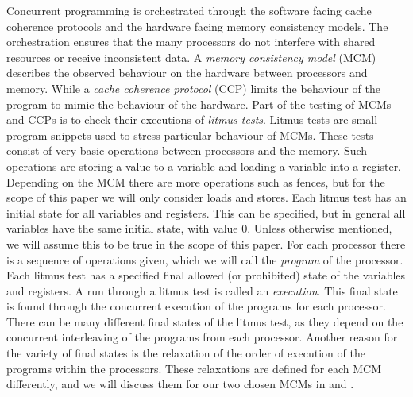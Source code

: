 \documentclass[runningheads]{llncs}
\begin{document}
Concurrent programming is orchestrated through the software facing cache coherence protocols and the hardware facing memory consistency models.
The orchestration ensures that the many processors do not interfere with shared resources or receive inconsistent data.
A \emph{memory consistency model} (MCM) describes the observed behaviour on the hardware between  processors and memory.
While a \emph{cache coherence protocol} (CCP) limits the behaviour of the program to mimic the behaviour of the hardware.
Part of the testing of MCMs and CCPs is to check their executions of \emph{litmus tests}.
Litmus tests are small program snippets used to stress particular behaviour of MCMs.
These tests consist of very basic operations between processors and the memory.
Such operations are storing a value to a variable and loading a variable into a register.
Depending on the MCM there are more operations such as fences, but for the scope of this paper we will only consider loads and stores.
Each litmus test has an initial state for all variables and registers.
This can be specified, but in general all variables have the same initial state, with value 0.
Unless otherwise mentioned, we will assume this to be true in the scope of this paper.
For each processor there is a sequence of operations given, which we will call the \emph{program} of the processor.
Each litmus test has a specified final allowed (or prohibited) state of the variables and registers.
A run through a litmus test is called an \emph{execution}.
This final state is found through the concurrent execution of the programs for each processor.
There can be many different final states of the litmus test, as they depend on the concurrent interleaving of the programs from each processor.
Another reason for the variety of final states is the relaxation of the order of execution of the programs within the processors.
These relaxations are defined for each MCM differently, and we will discuss them for our two chosen MCMs in  and .
\end{document}
